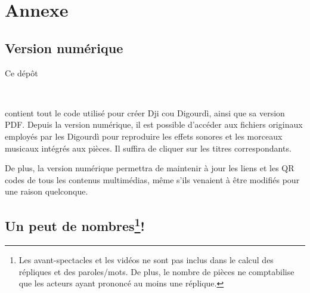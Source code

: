 \documentclass[11pt, twoside, openright]{book}
\begin{document}
\frontmatter

\clearpage
\thispagestyle{empty}



\tableofcontents
\clearpage
\listofvideos
\listofsounds
\listofeffets
\listoffotos




\mainmatter

%
%
%
%
%
%
%
%
%
% 


\backmatter
\chapter*{Annexe}
\section*{Version numérique}
Ce dépôt
\begin{center}
\centering
\github\ \hspace*{0.5mm} \href{\detokenize{https://github.com/jbollon/Dji-cou-Digourdi}}{} \hspace*{0.5mm} \github\\
 \vspace*{2mm}
\end{center}
\noindent  contient tout le code utilisé pour créer Dji cou Digourdì, ainsi que sa version PDF. Depuis la version numérique, il est possible d'accéder aux fichiers originaux employés par les Digourdì pour reproduire les effets sonores et les morceaux musicaux intégrés aux pièces. Il suffira de cliquer sur les titres correspondants.

De plus, la version numérique permettra de maintenir à jour les liens et les QR codes de tous les contenus multimédias, même s'ils venaient à être modifiés pour une raison quelconque.

\newpage
\section*{Un peut de nombres\footnote{Les avant-spectacles et les vidéos ne sont pas inclus dans le calcul des répliques et des paroles/mots. De plus, le nombre de pièces ne comptabilise que les acteurs ayant prononcé au moins une réplique.}!}



\end{document}

